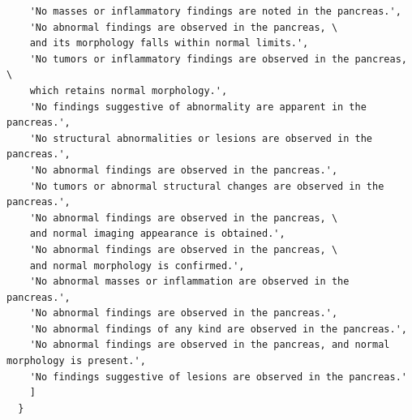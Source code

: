 \documentclass[bioengineering,article,submit,pdftex,moreauthors]{Definitions/mdpi}
\begin{document}
\begin{verbatim}
    'No masses or inflammatory findings are noted in the pancreas.',
    'No abnormal findings are observed in the pancreas, \
    and its morphology falls within normal limits.',
    'No tumors or inflammatory findings are observed in the pancreas, \
    which retains normal morphology.',
    'No findings suggestive of abnormality are apparent in the pancreas.',
    'No structural abnormalities or lesions are observed in the pancreas.',
    'No abnormal findings are observed in the pancreas.',
    'No tumors or abnormal structural changes are observed in the pancreas.',
    'No abnormal findings are observed in the pancreas, \
    and normal imaging appearance is obtained.',
    'No abnormal findings are observed in the pancreas, \
    and normal morphology is confirmed.',
    'No abnormal masses or inflammation are observed in the pancreas.',
    'No abnormal findings are observed in the pancreas.',
    'No abnormal findings of any kind are observed in the pancreas.',
    'No abnormal findings are observed in the pancreas, and normal morphology is present.',
    'No findings suggestive of lesions are observed in the pancreas.'
    ]
  }
\end{verbatim}


\end{document}
